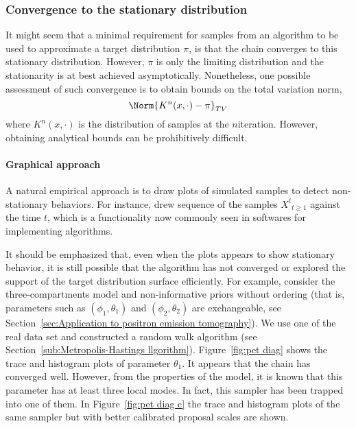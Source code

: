 \subsubsection{Convergence to the stationary distribution}
\label{ssub:Convergence to the stationary distribution}

It might seem that a minimal requirement for samples from an \mcmc algorithm
to be used to approximate a target distribution $\pi$, is that the chain
converges to this stationary distribution. However, $\pi$ is only the limiting
distribution and the stationarity is at best achieved asymptotically.
Nonetheless, one possible assessment of such convergence is to obtain bounds
on the total variation norm,
\begin{equation*}
  \Norm{K^n(x,\cdot)-\pi}_{TV}
\end{equation*}
where $K^n(x,\cdot)$ is the distribution of samples at the $n$\xth iteration.
However, obtaining analytical bounds can be prohibitively difficult.

\paragraph{Graphical approach}

A natural empirical approach is to draw plots of simulated samples to detect
non-stationary behaviors. For instance, \cite{Gelfand:1990it} drew sequence of
the samples ${X^t}_{t\ge1}$ against the time $t$, which is a functionality now
commonly seen in softwares for implementing \mcmc algorithms.

It should be emphasized that, even when the plots appears to show stationary
behavior, it is still possible that the algorithm has not converged or
explored the support of the target distribution surface efficiently. For
example, consider the three-compartments \pet model and non-informative priors
without ordering (that is, parameters such as $(\phi_1,\theta_1)$ and
$(\phi_2,\theta_2)$ are exchangeable, see Section~\ref{sec:Application to
  positron emission tomography}). We use one of the real data set and
constructed a random walk algorithm (see Section~\ref{sub:Metropolis-Hastings
  llgorithm}). Figure~\ref{fig:pet diag} shows the trace and histogram plots
of parameter $\theta_1$. It appears that the \mcmc chain has converged well.
However, from the properties of the model, it is known that this parameter has
at least three local modes. In fact, this sampler has been trapped into one of
them. In Figure~\ref{fig:pet diag c} the trace and histogram plots of the same
sampler but with better calibrated proposal scales are shown.

